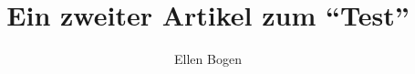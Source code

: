 \documentclass{dtk2}
\author{Ellen Bogen}
\begin{document}
\title{Ein zweiter Artikel zum "`Test"'}

\maketitle

\blinddocument

%
\end{document}

